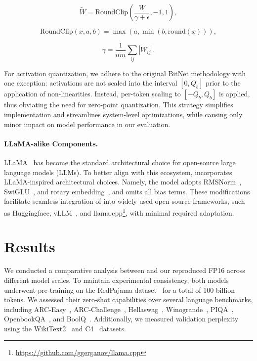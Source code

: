 \begin{equation}
    \widetilde{W} = \mathrm{RoundClip}(\frac{W}{\gamma + \epsilon}, -1, 1),
\end{equation}

\begin{equation}
    \mathrm{RoundClip}(x, a, b) = \max(a, \min(b, \mathrm{round}(x))),
\end{equation}

\begin{equation}
    \gamma = \frac{1}{nm}\sum_{ij} |W_{ij}|.
\end{equation}

For activation quantization, we adhere to the original BitNet methodology with one exception: activations are not scaled into the interval $[0, Q_b]$ prior to the application of non-linearities. Instead, per-token scaling to $[-Q_b, Q_b]$ is applied, thus obviating the need for zero-point quantization. This strategy simplifies implementation and streamlines system-level optimizations, while causing only minor impact on model performance in our evaluation.

\paragraph{LLaMA-alike Components.}

LLaMA~\cite{llama, llama2} has become the standard architectural choice for open-source large language models (LLMs). To better align with this ecosystem,  incorporates LLaMA-inspired architectural choices. Namely, the model adopts RMSNorm~\cite{rmsnorm}, SwiGLU~\cite{swiglu}, and rotary embedding~\cite{rope}, and omits all bias terms. These modifications facilitate seamless integration of  into widely-used open-source frameworks, such as Huggingface, vLLM~\cite{vllm}, and llama.cpp\footnote{\url{https://github.com/ggerganov/llama.cpp}}, with minimal required adaptation.

\section{Results}

We conducted a comparative analysis between  and our reproduced FP16  across different model scales. To maintain experimental consistency, both models underwent pre-training on the RedPajama dataset~\cite{redpajama} for a total of 100 billion tokens. We assessed their zero-shot capabilities over several language benchmarks, including ARC-Easy~\cite{arc}, ARC-Challenge~\cite{arc}, Hellaswag~\cite{hellaswag}, Winogrande~\cite{winoGrande}, PIQA~\cite{piqa}, OpenbookQA~\cite{openbookqa}, and BoolQ~\cite{boolq}. Additionally, we measured validation perplexity using the WikiText2~\cite{wikitext2} and C4~\cite{c4} datasets.

